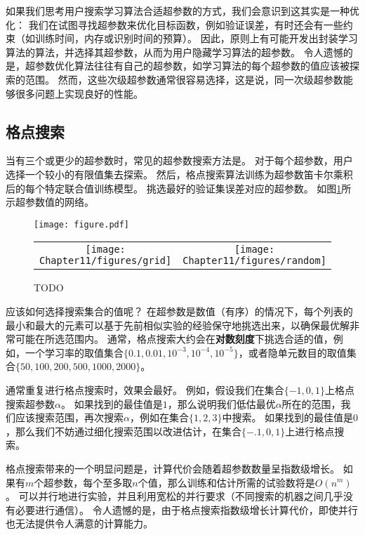 如果我们思考用户搜索学习算法合适超参数的方式，我们会意识到这其实是一种优化：
我们在试图寻找超参数来优化目标函数，例如验证误差，有时还会有一些约束（如训练时间，内存或识别时间的预算）。
因此，原则上有可能开发出封装学习算法的算法，并选择其超参数，从而为用户隐藏学习算法的超参数。
令人遗憾的是，超参数优化算法往往有自己的超参数，如学习算法的每个超参数的值应该被探索的范围。
然而，这些次级超参数通常很容易选择，这是说，同一次级超参数能够很多问题上实现良好的性能。

\subsection{格点搜索}
\label{subsec:grid_search}
当有三个或更少的超参数时，常见的超参数搜索方法是。
对于每个超参数，用户选择一个较小的有限值集去探索。
然后，格点搜索算法训练为超参数笛卡尔乘积后的每个特定联合值训练模型。
挑选最好的验证集误差对应的超参数。
如图\ref{fig:chap11_grid_vs_random}所示超参数值的网络。


\begin{figure}[!htb]
\ifOpenSource
\centerline{\texttt{[image: figure.pdf]}}
\else
\begin{tabular}{cc}
\texttt{[image: Chapter11/figures/grid]} &
\texttt{[image: Chapter11/figures/random]}
\end{tabular}
\fi
\caption{TODO}
\label{fig:chap11_grid_vs_random}
\end{figure}

应该如何选择搜索集合的值呢？
在超参数是数值（有序）的情况下，每个列表的最小和最大的元素可以基于先前相似实验的经验保守地挑选出来，以确保最优解非常可能在所选范围内。
通常，格点搜索大约会在\textbf{对数刻度}下挑选合适的值，例如，一个学习率的取值集合$\{0.1,0.01,10^{-3},10^{-4},10^{-5}\}$，或者隐单元数目的取值集合$\{50,100,200,500,1000,2000\}$。

通常重复进行格点搜索时，效果会最好。
例如，假设我们在集合$\{-1,0,1\}$上格点搜索超参数$\alpha$。
如果找到的最佳值是$1$，那么说明我们低估最优$\alpha$所在的范围，我们应该搜索范围，再次搜索$\alpha$，例如在集合$\{1,2,3\}$中搜索。
如果找到的最佳值是$0$，那么我们不妨通过细化搜索范围以改进估计，在集合$\{-.1,0,1\}$上进行格点搜索。


格点搜索带来的一个明显问题是，计算代价会随着超参数数量呈指数级增长。
如果有$m$个超参数，每个至多取$n$个值，那么训练和估计所需的试验数将是$O(n^m)$。
可以并行地进行实验，并且利用宽松的并行要求（不同搜索的机器之间几乎没有必要进行通信）。
令人遗憾的是，由于格点搜索指数级增长计算代价，即使并行也无法提供令人满意的计算能力。


